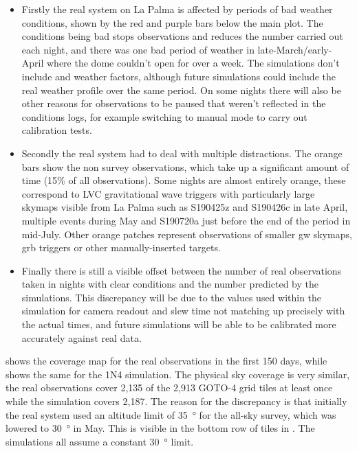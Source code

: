 \begin{colsection}
\begin{colsection}
\begin{itemize}
    \item Firstly the real system on La Palma is affected by periods of bad weather conditions, shown by the red and purple bars below the main plot. The conditions being bad stops observations and reduces the number carried out each night, and there was one bad period of weather in late-March/early-April where the dome couldn't open for over a week. The simulations don't include and weather factors, although future simulations could include the real weather profile over the same period. On some nights there will also be other reasons for observations to be paused that weren't reflected in the conditions logs, for example switching to manual mode to carry out calibration tests.
    \item Secondly the real system had to deal with multiple distractions. The orange bars show the non survey observations, which take up a significant amount of time (15\% of all observations). Some nights are almost entirely orange, these correspond to LVC gravitational wave triggers with particularly large skymaps visible from La Palma such as S190425z and S190426c in late April, multiple events during May and S190720a just before the end of the period in mid-July. Other orange patches represent observations of smaller \gls{gw} skymaps, \gls{grb} triggers or other manually-inserted targets.
    \item Finally there is still a visible offset between the number of real observations taken in nights with clear conditions and the number predicted by the simulations. This discrepancy will be due to the values used within the simulation for camera readout and slew time not matching up precisely with the actual times, and future simulations will be able to be calibrated more accurately against real data.
\end{itemize}

 shows the coverage map for the real observations in the first 150 days, while  shows the same for the 1N4 simulation. The physical sky coverage is very similar, the real observations cover 2,135 of the 2,913 GOTO-4 grid tiles at least once while the simulation covers 2,187. The reason for the discrepancy is that initially the real system used an altitude limit of \SI{35}{\degree} for the all-sky survey, which was lowered to \SI{30}{\degree} in May. This is visible in the bottom row of tiles in . The simulations all assume a constant \SI{30}{\degree} limit.


\end{colsection}
\end{colsection}
